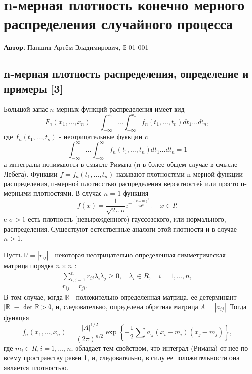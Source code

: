 
\section{n-мерная плотность конечно мерного распределения случайного процесса}

\textbf{Автор:} Паншин Артём Владимирович, Б-01-001

\subsection{n-мерная плотность распределения, определение и примеры [3]} %
Большой запас $n$-мерных функций распределения имеет вид
$$
F_n\left(x_1, \ldots, x_n\right)=\int_{-\infty}^{x_1} \ldots \int_{-\infty}^{x_n} f_n\left(t_1, \ldots, t_n\right) d t_1 \ldots d t_n,
$$
где $f_n\left(t_1, \ldots, t_n\right)$ - неотрицательные функции $\mathrm{c}$
$$
\int_{-\infty}^{\infty} \ldots \int_{-\infty}^{\infty} f_n\left(t_1, \ldots, t_n\right) d t_1 \ldots d t_n=1
$$
а интегралы понимаются в смысле Римана (и в более общем случае в смысле Лебега). Функции $f=f_n\left(t_1, \ldots, t_n\right)$ называют плотностями n-мерной функции распределения, п-мерной плотностью распределения вероятностей или просто п-мерными плотностями.
В случае $n=1$ функция
$$
f(x)=\frac{1}{\sqrt{2 \pi} \sigma} e^{-\frac{(x-m)^2}{2 \sigma^2}}, \quad x \in R
$$
c $\sigma>0$ есть плотность (невырожденного) гауссовского, или нормального, распределения. Существуют естественные аналоги этой плотности и в случае $n>1$.

Пусть $\mathbb{R}=\left| r_{i j}\right|$ - некоторая неотрицательно определенная симметрическая матрица порядка $n \times n$ :
$$
\begin{gathered}
\sum_{i, j=1}^n r_{i j} \lambda_i \lambda_j \geqslant 0, \quad \lambda_i \in R, \quad i=1, \ldots, n, \\
r_{i j}=r_{j i} .
\end{gathered}
$$
В том случае, когда $\mathbb{R}$ - положительно определенная матрица, ее детерминант $|\mathbb{R}| \equiv \operatorname{det} \mathbb{R}>0$, и, следовательно, определена обратная матрица $A=\left|a_{i j}\right|$. Тогда функция
$$
f_n\left(x_1, \ldots, x_n\right)=\frac{|A|^{1 / 2}}{(2 \pi)^{n / 2}} \exp \left\{-\frac{1}{2} \sum a_{i j}\left(x_i-m_i\right)\left(x_j-m_j\right)\right\},
$$
где $m_i \in R, i=1, \ldots, n$, обладает тем свойством, что интеграл (Римана) от нее по всему пространству равен 1, и, следовательно, в силу ее положительности она является плотностью.

